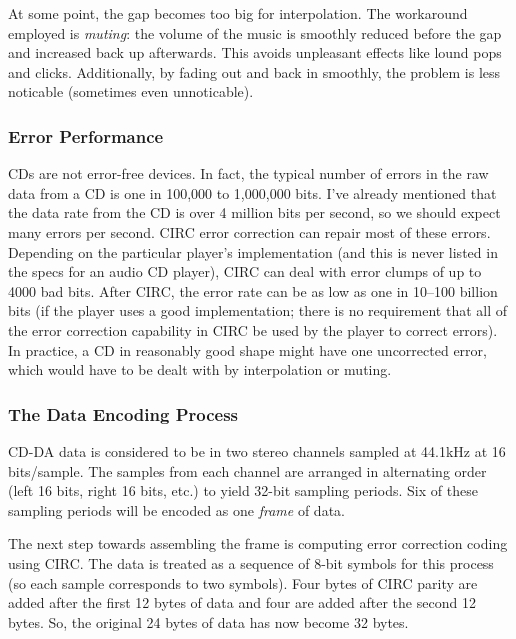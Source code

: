 At some point, the gap becomes too big for interpolation. The
workaround employed is \emph{muting}: the volume of the music is
smoothly reduced before the gap and increased back up afterwards.
This avoids unpleasant effects like lound pops and clicks.
Additionally, by fading out and back in smoothly, the problem is less
noticable (sometimes even unnoticable).

\subsubsection{Error Performance}

CDs are not error-free devices. In fact, the typical number of errors
in the raw data from a CD is one in 100,000 to 1,000,000 bits. I've
already mentioned that the data rate from the CD is over 4 million
bits per second, so we should expect many errors per second. CIRC
error correction can repair most of these errors.  Depending on the
particular player's implementation (and this is never listed in the
specs for an audio CD player), CIRC can deal with error clumps of up
to 4000 bad bits.  After CIRC, the error rate can be as low as one in
10--100 billion bits (if the player uses a good implementation; there
is no requirement that all of the error correction capability in CIRC
be used by the player to correct errors). In practice, a CD in
reasonably good shape might have one uncorrected error, which would
have to be dealt with by interpolation or muting.

\subsubsection{The Data Encoding Process}

CD-DA data is considered to be in two stereo channels sampled at
44.1kHz at 16 bits/sample. The samples from each channel are arranged
in alternating order (left 16 bits, right 16 bits, etc.) to yield
32-bit sampling periods. Six of these sampling periods will be encoded
as one \emph{frame} of data.

The next step towards assembling the frame is computing error
correction coding using CIRC. The data is treated as a sequence of
8-bit symbols for this process (so each sample corresponds to two
symbols). Four bytes of CIRC parity are added after the first 12 bytes
of data and four are added after the second 12 bytes. So, the original
24 bytes of data has now become 32 bytes.

